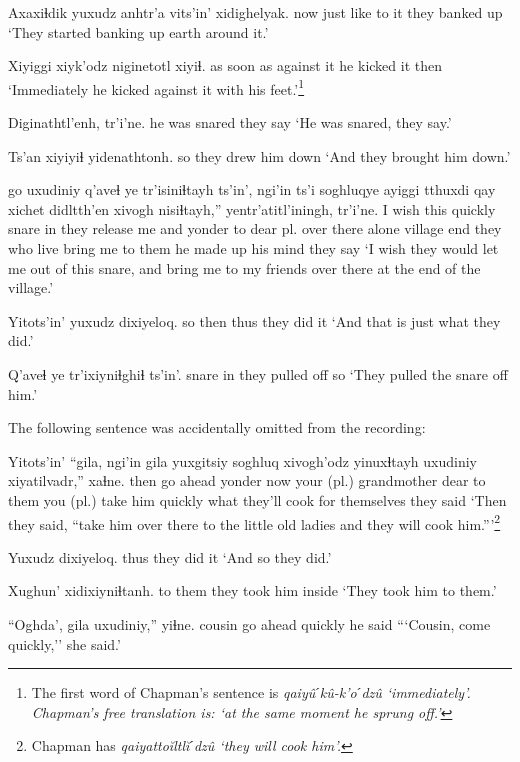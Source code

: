 \documentclass[12pt]{article}
\begin{document}
\gll Axaxiɬdik yuxudz anhtr'a vits'in' xidighelyak. 
now  {} {just like} {to it}  {they banked up}  
\glt `They started banking up earth around it.'
\glend

\gll Xiyiggi xiyk'odz niginetotl xiyiɬ.
{as soon as} {against it} {he kicked it} then
\glt `Immediately he kicked against it with his feet.'\footnote{The first word of Chapman's sentence is \em qaiy\^uˊk\^u-k'oˊdz\^u \em `immediately'.  Chapman's free translation is: `at the same moment he sprung off.'}
\glend

\gll Diginathtl'enh, tr'i'ne.
{he was snared} {they say}
\glt `He was snared, they say.'
\glend

\gll Ts'an {xiyiyiɬ yidenathtonh.}
so {they drew him down}
\glt `And they brought him down.'
\glend

 go uxudiniy q'aveɬ ye tr'isiniɬtayh ts'in', ngi'in  ts'i soghluqye ayiggi  tthuxdi qay  xichet didltth'en {xivogh nisiɬtayh,''}  yentr'atitl'iningh,  tr'i'ne.
{I wish}  this quickly snare in {they release me} and yonder  to {dear pl.}  {over there} alone village  end {they who live} {bring me to them} {he made up his mind}   {they say}
\glt `I wish they would let me out of this snare, and bring me to my friends over there at the end of the village.'
\glend

\gll Yitots'in' yuxudz dixiyeloq.
{so then}  thus {they did it}
\glt `And that is just what they did.'
\glend

\gll Q'aveɬ ye tr'ixiyniɬghiɬ ts'in'.
snare  in {they pulled off}  so
\glt `They pulled the snare off him.'
\glend

The following sentence was accidentally omitted from the recording:

\gll Yitots'in' ``gila, ngi'in  gila yuxgitsiy  soghluq xivogh'odz yinuxɬtayh uxudiniy xiyatilvadr,'' xaɬne.
then   {go ahead} yonder  now {your (pl.) grandmother}  dear {to them} {you (pl.) take him} quickly {what they'll cook for themselves} {they said}
\glt `Then they said, ``take him over there to the little old ladies and they will cook him.'''\footnote{Chapman has \em qaiyatto\u{i}ltl\u{i}ˊdz\^u \em `they will cook him'.}
\glend

\gll Yuxudz dixiyeloq.
thus  {they did it}
\glt `And so they did.'
\glend

\gll Xughun' xidixiyniɬtanh.
{to them} {they took him inside}
\glt `They took him to them.'
\glend

\gll ``Oghda', gila uxudiniy,'' yiɬne.
cousin  {go ahead} quickly {he said}
\glt ```Cousin, come quickly,'' she said.'
\glend
\end{document}
